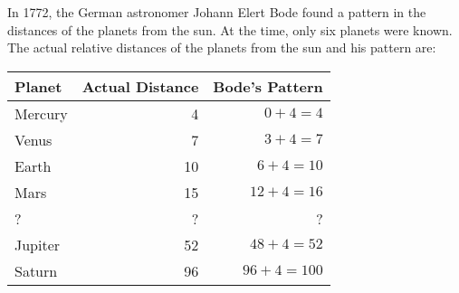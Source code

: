 \documentclass[letterpaper, landscape]{exam}
\begin{document}
  \begin{questions}

    \question

    In 1772, the German astronomer Johann Elert Bode found a pattern in the distances of the planets
    from the sun.  At the time, only six planets were known.  The actual relative distances of the
    planets from the sun and his pattern are:

    \begin{tabular}{lrr}
      \toprule
      Planet  & Actual Distance & Bode's Pattern \\ 
      \midrule
      Mercury & 4               & \( 0 + 4 = 4 \) \\
      Venus   & 7               & \( 3 + 4 = 7 \) \\
      Earth   & 10              & \( 6 + 4 = 10 \) \\
      Mars    & 15              & \( 12 + 4 = 16 \) \\
      ?       & ?               & ? \\
      Jupiter & 52              & \( 48 + 4 = 52 \) \\
      Saturn  & 96              & \( 96 + 4 = 100 \) \\
      \bottomrule
    \end{tabular}

\end{questions}
\end{document}
